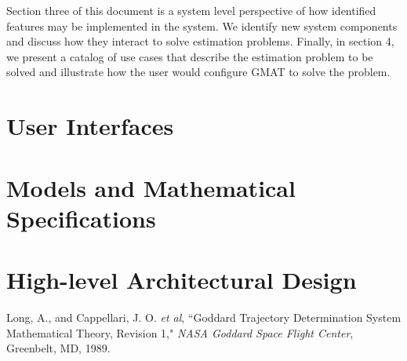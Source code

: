\documentclass[letterpaper,10pt]{book}
\begin{document}
Section three of this document is a system level perspective of how
identified features may be implemented in the system.  We identify
new system components and discuss how they interact to solve
estimation problems.    Finally, in section 4, we present a catalog
of use cases that describe the estimation problem to be solved and
illustrate how the user would configure GMAT to solve the problem.

\chapter{User Interfaces}
    
    
    
    
    
    
    

\chapter{Models and Mathematical Specifications}
    
    
    
    
    

\chapter{High-level Architectural Design}
    
    
    
    
    
    
    






\begin{thebibliography}{9}%

    Long, A., and Cappellari, J. O. \emph{et al}, ``Goddard Trajectory Determination System
    Mathematical Theory, Revision 1,"  \emph{NASA Goddard Space Flight Center}, Greenbelt, MD, 1989.

\end{thebibliography}
\end{document}
